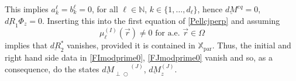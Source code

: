 \documentclass{ws-m3as}
\newcommand{\uld}[1]{\underline{d#1}}
\def\uldMpp{\uld{M}_{\perp\!\!\!\!\!\bigcirc}}
\newcommand\Xpar{\mathbb{X}_{\text{par}}}
\begin{document}

This implies $a^\ell_k=b^\ell_k=0$, for all $\ell\in\mathbb{N}$, $k\in\{1,\ldots,d_\ell\}$, hence $\uld{M}^{eq}=0$, $\uld{R}_1\Phi_z=0$.
Inserting this into the first equation of \eqref{Pellcjperp} and assuming
\begin{equation}\label{muIell}
\mu_\ell^{(I)}(\vec r)\not=0\text{ for a.e. }{\vec r}\in\Omega
\end{equation}
implies that  
$\uld{R}_2^*$ 
vanishes, provided it is contained in $\Xpar$. 
Thus, the initial and right hand side data in \eqref{FImodprime0}, \eqref{FJmodprime0} vanish and so, as a consequence, do the states ${\uldMpp}^{(J)}$, $\uld{M}_z^{(J)}$.
\end{document}
